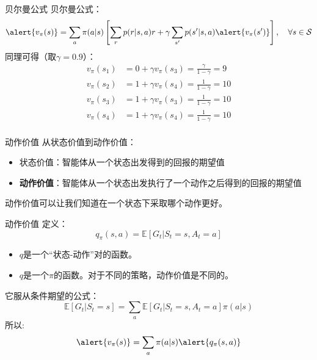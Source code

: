 \documentclass[aspectratio=169,xcolor=dvipsnames]{beamer}
\begin{document}
\begin{frame}{贝尔曼公式}
    贝尔曼公式：
    \[
        \alert{v_\pi(s)}=\sum_a\pi(a|s)\left[\sum_r p(r|s,a)r+\gamma\sum_{s'}p(s'|s,a)\alert{v_{\pi}(s')}\right], \quad \forall s\in\mathcal{S}
    \]
    同理可得（取$\gamma=0.9$）：
    \[
        \begin{aligned}
            v_\pi(s_1)&=0+\gamma v_\pi(s_3)=\frac{\gamma}{1-\gamma}=9 \\
            v_\pi(s_2)&=1+\gamma v_\pi(s_4)=\frac{1}{1-\gamma}=10 \\
            v_\pi(s_3)&=1+\gamma v_\pi(s_3)=\frac{1}{1-\gamma}=10 \\
            v_\pi(s_4)&=1+\gamma v_\pi(s_4)=\frac{1}{1-\gamma}=10\\
        \end{aligned}
    \]

\end{frame}

\begin{frame}{动作价值}
    从状态价值到动作价值：
    \begin{itemize}
        \item 状态价值：智能体从一个状态出发得到的回报的期望值
        \item \textbf{动作价值}：智能体从一个状态出发执行了一个动作之后得到的回报的期望值
    \end{itemize}
    动作价值可以让我们知道在一个状态下采取哪个动作更好。
\end{frame}

\begin{frame}{动作价值}
    定义：
    \[
        q_\pi(s,a)=\mathbb{E}[G_t|S_t=s,A_t=a]
    \]
    \begin{itemize}
        \item $q$是一个“状态-动作”对的函数。
        \item $q$是一个$\pi$的函数。对于不同的策略，动作价值是不同的。
    \end{itemize}
    它服从条件期望的公式：
    \begin{equation}
        \mathbb{E}[G_t|S_t=s]=\sum_a\mathbb{E}[G_t|S_t=s,A_t=a]\pi(a|s)
    \end{equation}
    所以:
    \begin{equation}
        \alert{v_\pi(s)}=\sum_a \pi(a|s)\alert{q_\pi(s,a)}
    \end{equation}
\end{frame}
\end{document}
